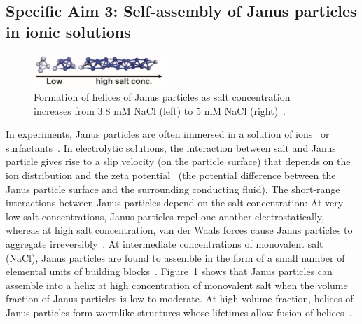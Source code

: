 \subsection{Specific Aim 3: Self-assembly of Janus particles in ionic solutions}
\label{subsec:specific_aim_3}

\begin{figure}
  \vspace{-5pt}
\centerline{\includegraphics[width=0.44\textwidth]{Figures/fig2A_Chen2011_Science}}
  \vspace{-5pt}
\caption{\label{fig:helices_of_JPs}Formation of helices
  of Janus particles as salt concentration increases from 3.8 mM NaCl
  (left) to 5 mM NaCl (right)~\cite{Chen2011_Science}.}
\end{figure}
In experiments, Janus particles are often immersed in a solution of
ions~\cite{Chen2011_Science} or surfactants~\cite{Goodwin2009}. In
electrolytic solutions, the interaction between salt and Janus particle
gives rise to a slip velocity (on the particle surface) that depends on
the ion distribution and the zeta potential~\cite{BayatiNajafi2016_JCP}
(the potential difference between the Janus particle surface and the
surrounding conducting fluid). The short-range interactions between
Janus particles depend on the salt concentration: At very low salt
concentrations, Janus particles repel one another electrostatically,
whereas at high salt concentration, van der Waals forces cause Janus
particles to aggregate irreversibly~\cite{Goodwin2009}. At intermediate
concentrations of monovalent salt (NaCl), Janus particles are found to
assemble in the form of a small number of elemental units of building
blocks~\cite{Chen2011_Science}. Figure~\ref{fig:helices_of_JPs} shows
that Janus particles can assemble into a helix at high concentration of
monovalent salt when the volume fraction of Janus particles is low to
moderate. At high volume fraction, helices of Janus particles form
wormlike structures whose lifetimes allow fusion of
helices~\cite{Chen2011_Science}. 

